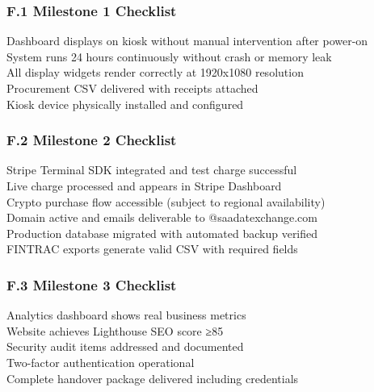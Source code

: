\documentclass[11pt, a4paper]{article}
\begin{document}
\subsubsection*{F.1 Milestone 1 Checklist}
\CheckBox[name=m1c1]{} Dashboard displays on kiosk without manual intervention after power-on\\
\CheckBox[name=m1c2]{} System runs 24 hours continuously without crash or memory leak\\
\CheckBox[name=m1c3]{} All display widgets render correctly at 1920x1080 resolution\\
\CheckBox[name=m1c4]{} Procurement CSV delivered with receipts attached\\
\CheckBox[name=m1c5]{} Kiosk device physically installed and configured

\subsubsection*{F.2 Milestone 2 Checklist}
\CheckBox[name=m2c1]{} Stripe Terminal SDK integrated and test charge successful\\
\CheckBox[name=m2c2]{} Live charge processed and appears in Stripe Dashboard\\
\CheckBox[name=m2c3]{} Crypto purchase flow accessible (subject to regional availability)\\
\CheckBox[name=m2c4]{} Domain active and emails deliverable to @saadatexchange.com\\
\CheckBox[name=m2c5]{} Production database migrated with automated backup verified\\
\CheckBox[name=m2c6]{} FINTRAC exports generate valid CSV with required fields

\subsubsection*{F.3 Milestone 3 Checklist}
\CheckBox[name=m3c1]{} Analytics dashboard shows real business metrics\\
\CheckBox[name=m3c2]{} Website achieves Lighthouse SEO score ≥85\\
\CheckBox[name=m3c3]{} Security audit items addressed and documented\\
\CheckBox[name=m3c4]{} Two-factor authentication operational\\
\CheckBox[name=m3c5]{} Complete handover package delivered including credentials

\end{document}
